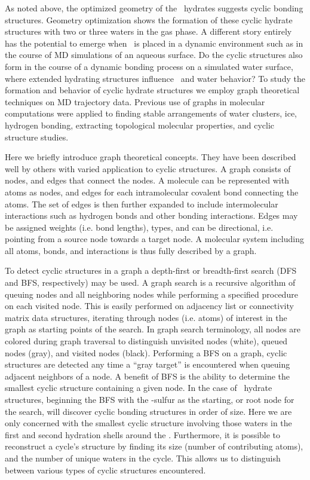 As noted above, the optimized geometry of the \suldiox~hydrates suggests cyclic bonding structures. Geometry optimization shows the formation of these cyclic hydrate structures with two or three waters in the gas phase. A different story entirely has the potential to emerge when \suldiox~is placed in a dynamic environment such as in the course of MD simulations of an aqueous surface. Do the cyclic structures also form in the course of a dynamic bonding process on a simulated water surface, where extended hydrating structures influence \suldiox~and water behavior? To study the formation and behavior of cyclic hydrate structures we employ graph theoretical techniques on MD trajectory data. Previous use of graphs in molecular computations were applied to finding stable arrangements of water clusters, ice, hydrogen bonding, extracting topological molecular properties, and cyclic structure studies.\cite{Anick2002, Huber2007, Radhakrishnan1991, Shi2005, Garcia2004, McDonald1998}

Here we briefly introduce graph theoretical concepts. They have been described well by others with varied application to cyclic structures.\cite{Tutte1984, Balakrishnan2000, Harary1973, Huber2007, Garcia2004, Dury2001} A graph consists of nodes, and edges that connect the nodes. A molecule can be represented with atoms as nodes, and edges for each intramolecular covalent bond connecting the atoms. The set of edges is then further expanded to include intermolecular interactions such as hydrogen bonds and other bonding interactions. Edges may be assigned weights (i.e. bond lengths), types, and can be directional, i.e. pointing from a source node towards a target node. A molecular system including all atoms, bonds, and interactions is thus fully described by a graph. 

To detect cyclic structures in a graph a depth-first or breadth-first search (DFS and BFS, respectively) may be used.\cite{Knuth1997, Cormen 2001} A graph search is a recursive algorithm of queuing nodes and all neighboring nodes while performing a specified procedure on each visited node. This is easily performed on adjacency list or connectivity matrix data structures, iterating through nodes (i.e. atoms) of interest in the graph as starting points of the search. In graph search terminology, all nodes are colored during graph traversal to distinguish unvisited nodes (white), queued nodes (gray), and visited nodes (black). Performing a BFS on a graph, cyclic structures are detected any time a ``gray target'' is encountered when queuing adjacent neighbors of a node. A benefit of BFS is the ability to determine the smallest cyclic structure containing a given node. In the case of \suldiox~hydrate structures, beginning the BFS with the \suldiox-sulfur as the starting, or root node for the search, will discover cyclic bonding structures in order of size. Here we are only concerned with the smallest cyclic structure involving those waters in the first and second hydration shells around the \suldiox. Furthermore, it is possible to reconstruct a cycle's structure by finding its size (number of contributing atoms), and the number of unique waters in the cycle. This allows us to distinguish between various types of cyclic structures encountered.

